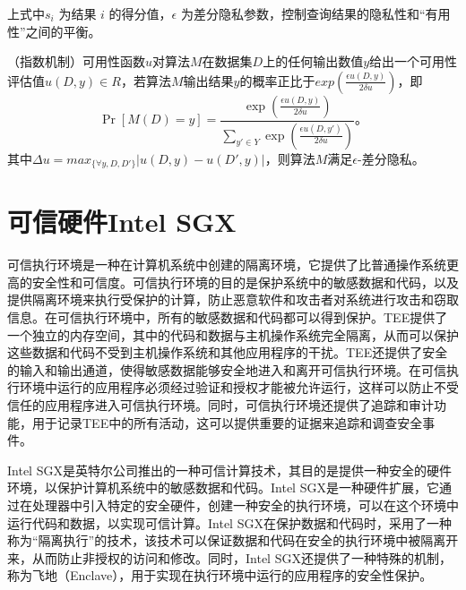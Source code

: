 上式中$s_i$ 为结果 $i$ 的得分值，$\epsilon$ 为差分隐私参数，控制查询结果的隐私性和“有用性”之间的平衡。


\begin{theorem}
	（指数机制\cite{mcsherry2007mechanism}）可用性函数$u$对算法$M$在数据集$D$上的任何输出数值$y$给出一个可用性评估值$u(D,y)\in R$，若算法$M$输出结果$y$的概率正比于$exp(\frac{\epsilon u(D,y)}{2\delta u})$，即
	\begin{equation}
		\mathop{Pr}[M(D)=y]=\frac{\exp(\frac{\epsilon u(D,y)}{2\delta u})}{\sum_{y'\in Y}\exp(\frac{\epsilon u(D,y')}{2\delta u})}\text{。}
	\end{equation}
其中$\Delta u = max_{\{\forall y, D, D'\}}|u(D,y)-u(D',y)|$，则算法$M$满足$\epsilon$-差分隐私。
\end{theorem}

\section{可信硬件Intel SGX}


可信执行环境是一种在计算机系统中创建的隔离环境，它提供了比普通操作系统更高的安全性和可信度。可信执行环境的目的是保护系统中的敏感数据和代码，以及提供隔离环境来执行受保护的计算，防止恶意软件和攻击者对系统进行攻击和窃取信息。在可信执行环境中，所有的敏感数据和代码都可以得到保护。TEE提供了一个独立的内存空间，其中的代码和数据与主机操作系统完全隔离，从而可以保护这些数据和代码不受到主机操作系统和其他应用程序的干扰。TEE还提供了安全的输入和输出通道，使得敏感数据能够安全地进入和离开可信执行环境。在可信执行环境中运行的应用程序必须经过验证和授权才能被允许运行，这样可以防止不受信任的应用程序进入可信执行环境。同时，可信执行环境还提供了追踪和审计功能，用于记录TEE中的所有活动，这可以提供重要的证据来追踪和调查安全事件。


Intel SGX是英特尔公司推出的一种可信计算技术，其目的是提供一种安全的硬件环境，以保护计算机系统中的敏感数据和代码。Intel SGX是一种硬件扩展，它通过在处理器中引入特定的安全硬件，创建一种安全的执行环境，可以在这个环境中运行代码和数据，以实现可信计算。Intel SGX在保护数据和代码时，采用了一种称为“隔离执行”的技术，该技术可以保证数据和代码在安全的执行环境中被隔离开来，从而防止非授权的访问和修改。同时，Intel SGX还提供了一种特殊的机制，称为飞地（Enclave），用于实现在执行环境中运行的应用程序的安全性保护。%

